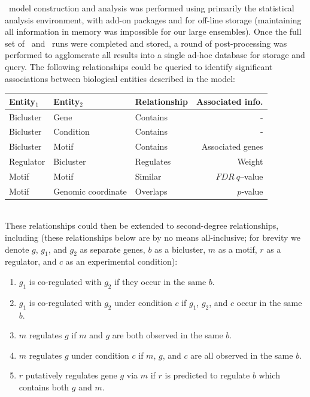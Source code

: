 \egrine~model construction and analysis was performed using
primarily the  statistical analysis environment, with add-on
packages  and  for off-line
storage (maintaining all information in memory was impossible for our
large ensembles). Once the full set of \cm\ and \nwinf\ runs were
completed and stored, a round of post-processing was performed to
agglomerate all results into a single ad-hoc database for storage and
query. The following relationships could be queried to identify
significant associations between biological entities described in the
model:

\begin{tabular}{|l|l|l|r|} 
\hline
Entity$_1$        & Entity$_2$         & Relationship  & Associated info. \\ \hline
Bicluster         & Gene               & Contains      & - \\
Bicluster         & Condition          & Contains      & - \\
Bicluster         & Motif              & Contains      & Associated genes \\
Regulator         & Bicluster          & Regulates     & Weight \\
Motif             & Motif              & Similar       & $FDR\ q$--value \\
Motif             & Genomic coordinate & Overlaps      & $p$-value \\
\hline
\end{tabular}
\\

\noindent These relationships could then be extended to second-degree
relationships, including (these relationships below are by no means
all-inclusive; for brevity we denote $g$, $g_1$, and $g_2$ as separate
genes, $b$ as a bicluster, $m$ as a motif, $r$ as a regulator, and $c$
as an experimental condition):

\begin{enumerate}
\item $g_1$ is co-regulated with $g_2$ if they occur in the same $b$.
\item $g_1$ is co-regulated with $g_2$ under condition $c$ if $g_1$, $g_2$, and $c$ occur in the same $b$.
\item $m$ regulates $g$ if $m$ and $g$ are both observed in the same $b$.
\item $m$ regulates $g$ under condition $c$ if $m$, $g$, and $c$ are all observed in the same $b$.
\item $r$ putatively regulates gene $g$ via $m$ if $r$ is predicted to regulate $b$ which contains both $g$ and $m$.
\end{enumerate}

